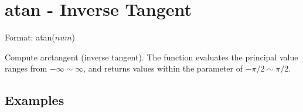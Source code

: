 
%

\section{atan - Inverse Tangent\label{sect:atan}}

Format: atan($num$)

Compute arctangent (inverse tangent). The function evaluates the principal value ranges from $-\infty\sim \infty$, and returns values within the parameter of $-\pi/2 \sim \pi/2$.


\subsection*{Examples }


%

